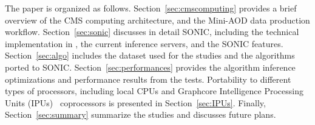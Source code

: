 The paper is organized as follows. Section~\ref{sec:cmscomputing} provides a brief overview of the CMS computing architecture, and the Mini-AOD data production workflow. Section~\ref{sec:sonic} discusses in detail SONIC, including the technical implementation in \CMSSW, the current inference servers, and the SONIC features. Section~\ref{sec:algo} includes the dataset used for the studies and the algorithms ported to SONIC.
Section~\ref{sec:performances} provides the algorithm inference optimizations and performance results from the tests. Portability to different types of processors, including local CPUs and Graphcore Intelligence Processing Units (IPUs)~\cite{Graphcore, IPU_Perf} coprocessors is presented in Section~\ref{sec:IPUs}. Finally, Section~\ref{sec:summary} summarize the studies and discusses future plans.